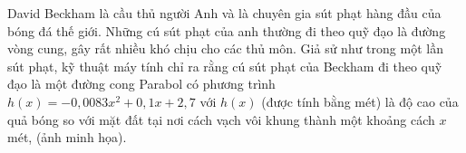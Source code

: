 \begin{bt}%
 David Beckham là cầu thủ người Anh và là chuyên gia sút phạt hàng đầu của bóng đá thế giới. Những cú sút phạt của anh thường đi theo quỹ đạo là đường vòng cung, gây rất nhiều khó chịu cho các thủ môn. Giả sử như trong một lần sút phạt, kỹ thuật máy tính chỉ ra rằng cú sút phạt của Beckham đi theo quỹ đạo là một đường cong Parabol có phương trình $h(x)=-0{,}0083x^2+0{,}1x+2{,}7$ với $h(x)$ (được tính bằng mét) là độ cao của quả bóng so với mặt đất tại nơi cách vạch vôi khung thành một khoảng cách $x$ mét, (ảnh minh họa).
 \begin{center}
\end{center}
\end{bt}
